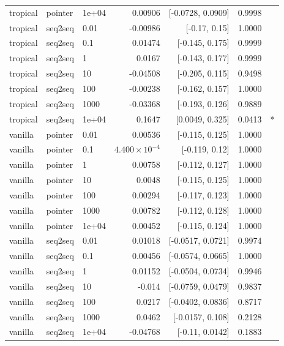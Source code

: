 \documentclass[10pt]{article}
\begin{document}
{\begin{longtable}{lllrrrl}
tropical & pointer & 1e+04 & 0.00906 & [-0.0728, 0.0909] & 0.9998 & \\
tropical & seq2seq & 0.01 & -0.00986 & [-0.17, 0.15] & 1.0000 & \\
tropical & seq2seq & 0.1 & 0.01474 & [-0.145, 0.175] & 0.9999 & \\
tropical & seq2seq & 1 & 0.0167 & [-0.143, 0.177] & 0.9999 & \\
tropical & seq2seq & 10 & -0.04508 & [-0.205, 0.115] & 0.9498 & \\
tropical & seq2seq & 100 & -0.00238 & [-0.162, 0.157] & 1.0000 & \\
tropical & seq2seq & 1000 & -0.03368 & [-0.193, 0.126] & 0.9889 & \\
tropical & seq2seq & 1e+04 & 0.1647 & [0.0049, 0.325] & 0.0413 & *\\
vanilla & pointer & 0.01 & 0.00536 & [-0.115, 0.125] & 1.0000 & \\
vanilla & pointer & 0.1 & $4.400\times10^{-4}$ & [-0.119, 0.12] & 1.0000 & \\
vanilla & pointer & 1 & 0.00758 & [-0.112, 0.127] & 1.0000 & \\
vanilla & pointer & 10 & 0.0048 & [-0.115, 0.125] & 1.0000 & \\
vanilla & pointer & 100 & 0.00294 & [-0.117, 0.123] & 1.0000 & \\
vanilla & pointer & 1000 & 0.00782 & [-0.112, 0.128] & 1.0000 & \\
vanilla & pointer & 1e+04 & 0.00452 & [-0.115, 0.124] & 1.0000 & \\
vanilla & seq2seq & 0.01 & 0.01018 & [-0.0517, 0.0721] & 0.9974 & \\
vanilla & seq2seq & 0.1 & 0.00456 & [-0.0574, 0.0665] & 1.0000 & \\
vanilla & seq2seq & 1 & 0.01152 & [-0.0504, 0.0734] & 0.9946 & \\
vanilla & seq2seq & 10 & -0.014 & [-0.0759, 0.0479] & 0.9837 & \\
vanilla & seq2seq & 100 & 0.0217 & [-0.0402, 0.0836] & 0.8717 & \\
vanilla & seq2seq & 1000 & 0.0462 & [-0.0157, 0.108] & 0.2128 & \\
vanilla & seq2seq & 1e+04 & -0.04768 & [-0.11, 0.0142] & 0.1883 & \\
\bottomrule
\end{longtable}
}
\end{document}
